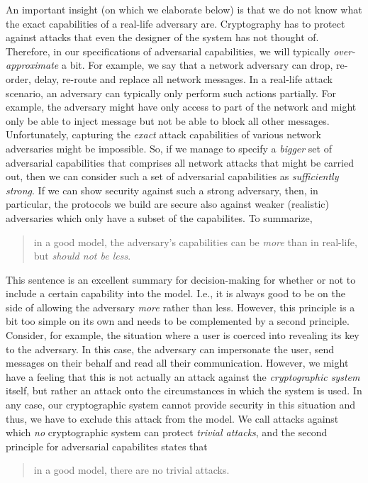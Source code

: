 An important insight (on which we elaborate below) is that we do not know what the exact capabilities of a real-life adversary are.
Cryptography has to protect against attacks that even the designer of the system has not thought of. 
Therefore, in our specifications of adversarial capabilities, we will typically \emph{over-approximate} a bit. 
For example, we say that a network adversary can drop, re-order, delay, re-route and replace all network messages.
In a real-life attack scenario, an adversary can typically only perform such actions partially. 
For example, the adversary might have only access to part of the network and might only be able to inject message but not be able to block all other messages. 
Unfortunately, capturing the \emph{exact} attack capabilities of various network adversaries might 
be impossible. 
So, if we manage to specify a \emph{bigger} set of adversarial capabilities that comprises all network attacks that might be carried out, then we can consider such a set of adversarial capabilities as \emph{sufficiently strong}. 
If we can show security against such a strong adversary, then, in particular, the protocols we build are secure also against weaker (realistic) adversaries which only have a subset of the capabilites. To summarize,
\begin{quote}
in a good model, the adversary's capabilities can be \emph{more} than in real-life, but \emph{should not be less}.
\end{quote}
This sentence is an excellent summary for decision-making for whether or not to include a certain capability into the model. I.e., it is always good to be on the side of allowing the adversary \emph{more} rather than less. However, this principle is a bit too simple on its own and needs to be complemented by a second principle. Consider, for example, the situation where a user is coerced into revealing its key to the adversary. In this case, the adversary can impersonate the user, send messages on their behalf and read all their communication. However, we might have a feeling that this is not actually an attack against the \emph{cryptographic system} itself, but rather an attack onto the circumstances in which the system is used. In any case, our cryptographic system cannot provide security in this situation and thus, we have to exclude this attack from the model. We call attacks against which \emph{no} cryptographic system can protect \emph{trivial attacks}, and the second principle for adversarial capabilites states that
\begin{quote}
in a good model, there are no trivial attacks.
\end{quote}

